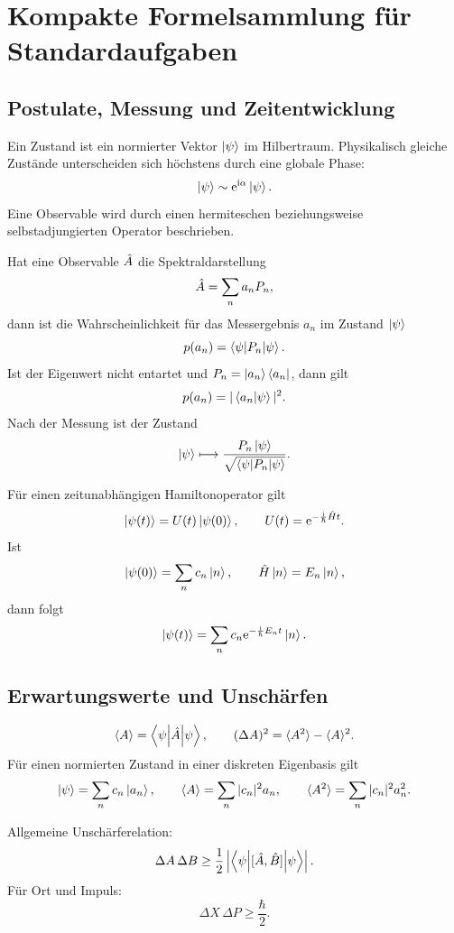 \section{Kompakte Formelsammlung für Standardaufgaben}

\subsection{Postulate, Messung und Zeitentwicklung}

\begin{formulabox}
Ein Zustand ist ein normierter Vektor $\left|\psi\right\rangle$ im Hilbertraum. Physikalisch gleiche Zustände unterscheiden sich höchstens durch eine globale Phase:
\[
    \left|\psi\right\rangle \sim \mathrm{e}^{\mathrm{i}\alpha}\left|\psi\right\rangle.
\]
Eine Observable wird durch einen hermiteschen beziehungsweise selbstadjungierten Operator beschrieben.
\end{formulabox}

Hat eine Observable $\hat A$ die Spektraldarstellung
\[
    \hat A=\sum_n a_n P_n,
\]
dann ist die Wahrscheinlichkeit für das Messergebnis $a_n$ im Zustand $\left|\psi\right\rangle$
\[
    p(a_n)=\left\langle\psi\middle|P_n\middle|\psi\right\rangle.
\]
Ist der Eigenwert nicht entartet und $P_n=\left|a_n\right\rangle\left\langle a_n\right|$, dann gilt
\[
    p(a_n)=|\left\langle a_n\middle|\psi\right\rangle|^2.
\]
Nach der Messung ist der Zustand
\[
    \left|\psi\right\rangle\longmapsto \frac{P_n\left|\psi\right\rangle}{\sqrt{\left\langle\psi\middle|P_n\middle|\psi\right\rangle}}.
\]

Für einen zeitunabhängigen Hamiltonoperator gilt
\[
    \left|\psi(t)\right\rangle=U(t)\left|\psi(0)\right\rangle,
    \qquad
    U(t)=\mathrm{e}^{-\frac{\mathrm{i}}{\hbar}\hat H t}.
\]
Ist
\[
    \left|\psi(0)\right\rangle=\sum_n c_n\left|n\right\rangle,
    \qquad
    \hat H\left|n\right\rangle=E_n\left|n\right\rangle,
\]
dann folgt
\[
    \left|\psi(t)\right\rangle=\sum_n c_n\mathrm{e}^{-\frac{\mathrm{i}}{\hbar}E_nt}\left|n\right\rangle.
\]

\subsection{Erwartungswerte und Unschärfen}

\[
    \langle A\rangle=\left\langle\psi\middle|\hat A\middle|\psi\right\rangle,
    \qquad
    (\Delta A)^2=\langle A^2\rangle-\langle A\rangle^2.
\]
Für einen normierten Zustand in einer diskreten Eigenbasis gilt
\[
    \left|\psi\right\rangle=\sum_n c_n\left|a_n\right\rangle,
    \qquad
    \langle A\rangle=\sum_n |c_n|^2 a_n,
    \qquad
    \langle A^2\rangle=\sum_n |c_n|^2 a_n^2.
\]

\begin{formulabox}
Allgemeine Unschärferelation:
\[
    \Delta A\,\Delta B\geq \frac12\left|\left\langle\psi\middle|[\hat A,\hat B]\middle|\psi\right\rangle\right|.
\]
Für Ort und Impuls:
\[
    \Delta X\,\Delta P\geq \frac{\hbar}{2}.
\]
\end{formulabox}

